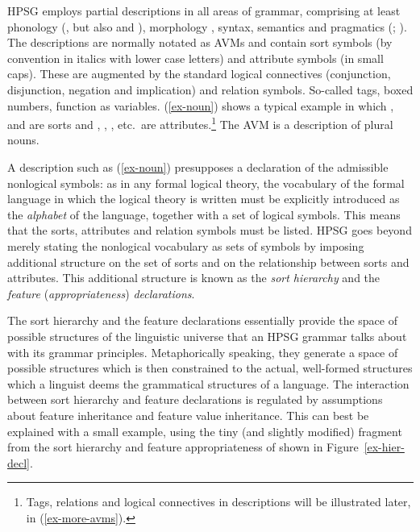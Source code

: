 \documentclass[output=paper,biblatex,babelshorthands,newtxmath,draftmode,colorlinks,citecolor=brown]{langscibook}
\begin{document}
HPSG employs partial descriptions in all areas of grammar, comprising
at least phonology (\citealp{Hoehle99a-u}, but also \citealp{BK94b} and
\citealp{Walther99a-u}), morphology , syntax,
semantics  and pragmatics (; ).
The descriptions are normally notated as AVMs and contain sort symbols (by
convention in italics with lower case letters) and attribute symbols
(in small caps). These are augmented by the standard
logical connectives (conjunction, disjunction, negation and
implication) and relation symbols. So-called tags, boxed
numbers, function as variables. (\ref{ex-noun}) shows a typical example
in which ,  and  are sorts and
, , , etc.\ are attributes.\footnote{Tags, relations and logical connectives in descriptions will be illustrated later, in (\ref{ex-more-avms}).}
The AVM is a description of plural nouns.

\ea
\label{ex-noun}
\z

A description such as (\ref{ex-noun}) presupposes a declaration of the
admissible nonlogical symbols: as in any formal logical theory, the
vocabulary of the formal language in which the logical theory is
written must be explicitly introduced as the \emph{alphabet} of the
language, together with a set of logical symbols. This means that the
sorts, attributes and relation symbols must be listed. HPSG
goes beyond merely stating the nonlogical vocabulary as sets of
symbols by imposing additional structure on the set of sorts and on
the relationship between sorts and attributes. This additional
structure is known as the \emph{sort hierarchy} and the \emph{feature}
  (\emph{appropriateness}) \emph{declarations}.

The sort hierarchy and the feature declarations essentially provide the
space of possible structures of the linguistic universe that an HPSG
grammar talks about with its grammar principles. Metaphorically
speaking, they generate a space of possible structures which is then
constrained to the actual, well-formed structures which a
linguist deems the grammatical structures of a language. The
interaction between sort hierarchy and feature declarations is
regulated by assumptions about feature inheritance and feature value
inheritance. This can best be explained with a small example, using
the tiny (and slightly modified) fragment from the sort hierarchy and
feature appropriateness of  shown in
Figure~\ref{ex-hier-decl}.
\end{document}

